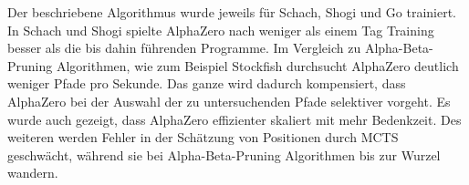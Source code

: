 Der beschriebene Algorithmus wurde jeweils für Schach, Shogi und Go trainiert. In Schach und Shogi spielte AlphaZero nach weniger als einem Tag Training besser als die bis dahin führenden Programme. Im Vergleich zu Alpha-Beta-Pruning Algorithmen, wie zum Beispiel Stockfish durchsucht AlphaZero deutlich weniger Pfade pro Sekunde. Das ganze wird dadurch kompensiert, dass AlphaZero bei der Auswahl der zu untersuchenden Pfade selektiver vorgeht. Es wurde auch gezeigt, dass AlphaZero effizienter skaliert mit mehr Bedenkzeit. Des weiteren werden Fehler in der Schätzung von Positionen durch \ac{MCTS} geschwächt, während sie bei Alpha-Beta-Pruning Algorithmen bis zur Wurzel wandern.
\cite{silver_mastering_2017}
